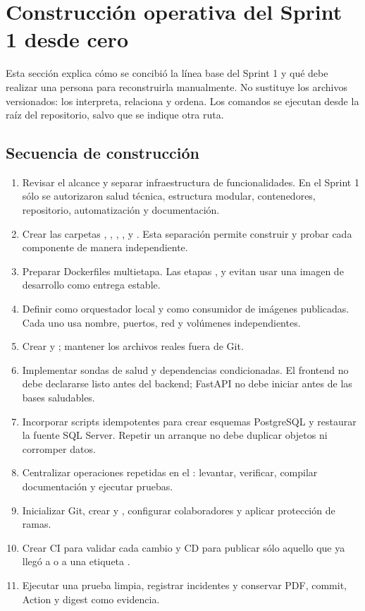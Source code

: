 \clearpage
\section{Construcción operativa del Sprint 1 desde cero}

Esta sección explica cómo se concibió la línea base del Sprint 1 y qué debe realizar una persona para reconstruirla manualmente. No sustituye los archivos versionados: los interpreta, relaciona y ordena. Los comandos se ejecutan desde la raíz del repositorio, salvo que se indique otra ruta.

\subsection{Secuencia de construcción}

\begin{enumerate}
  \item Revisar el alcance y separar infraestructura de funcionalidades. En el Sprint 1 sólo se autorizaron salud técnica, estructura modular, contenedores, repositorio, automatización y documentación.
  \item Crear las carpetas , , , ,  y . Esta separación permite construir y probar cada componente de manera independiente.
  \item Preparar Dockerfiles multietapa. Las etapas ,  y  evitan usar una imagen de desarrollo como entrega estable.
  \item Definir  como orquestador local y  como consumidor de imágenes publicadas. Cada uno usa nombre, puertos, red y volúmenes independientes.
  \item Crear  y ; mantener los archivos reales fuera de Git.
  \item Implementar sondas de salud y dependencias condicionadas. El frontend no debe declararse listo antes del backend; FastAPI no debe iniciar antes de las bases saludables.
  \item Incorporar scripts idempotentes para crear esquemas PostgreSQL y restaurar la fuente SQL Server. Repetir un arranque no debe duplicar objetos ni corromper datos.
  \item Centralizar operaciones repetidas en el : levantar, verificar, compilar documentación y ejecutar pruebas.
  \item Inicializar Git, crear  y , configurar colaboradores y aplicar protección de ramas.
  \item Crear CI para validar cada cambio y CD para publicar sólo aquello que ya llegó a  o a una etiqueta .
  \item Ejecutar una prueba limpia, registrar incidentes y conservar PDF, commit, Action y digest como evidencia.
\end{enumerate}

